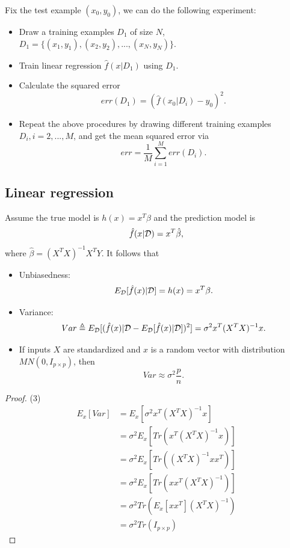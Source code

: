 \begin{refsection}
\begin{method}
Fix the test example $(x_0,y_0)$, we can do the following experiment:
\begin{itemize}
	\item Draw a training examples $D_1$ of size $N$, $D_1=\{(x_1,y_1),(x_2,y_2),...,(x_N, y_N)\}$.
	\item Train linear regression $\hat{f}(x|D_1)$ using $D_1$.
	\item Calculate the squared error
	$$err(D_1) = (\hat{f}(x_0|D_i) - y_0)^2.$$
	\item Repeat the above procedures by drawing different training examples $D_i,i=2,...,M$, and get the mean squared error via
	$$err = \frac{1}{M}\sum_{i=1}^M err(D_i).$$ 
\end{itemize}	
\end{method}



\subsection{Linear regression}
\begin{lemma}
Assume the true model is $h(x) = x^T\beta$ and the prediction model is $$\hat{f}(x|\mathcal{D}) = x^T\hat{\beta},$$
where $\hat{\beta} = (X^TX)^{-1}X^TY$.
It follows that
\begin{itemize}
	\item Unbiasedness:
	$$E_{\mathcal{D}}[\hat{f}(x)|\mathcal{D}] = h(x) = x^T\beta.$$
	\item Variance:
	$$Var\triangleq E_{\mathcal{D}}[(\hat{f}(x)|\mathcal{D} - E_{\mathcal{D}}[\hat{f}(x)|\mathcal{D}])^2] = \sigma^2 x^T(X^TX)^{-1}x.$$
	\item If inputs $X$ are standardized and $x$ is a random vector with distribution $MN(0,I_{p\times p})$, then
	$$Var\approx \sigma^2 \frac{p}{n}.$$
\end{itemize}	
\end{lemma}
\begin{proof}
	
	



(3)
\begin{align*}
E_{x}[Var] &=  E_{x}[\sigma^2 x^T(X^TX)^{-1}x] \\
&=  \sigma^2E_{x}[Tr( x^T(X^TX)^{-1}x)] \\
&=  \sigma^2E_{x}[Tr( (X^TX)^{-1}xx^T)] \\
&=  \sigma^2 E_{x}[Tr( xx^T(X^TX)^{-1})] \\
&=  \sigma^2 Tr(E_{x}[xx^T] (X^TX)^{-1})\\
&=  \sigma^2 Tr(I_{p\times p} )
\end{align*}



\end{proof}
\end{refsection}
